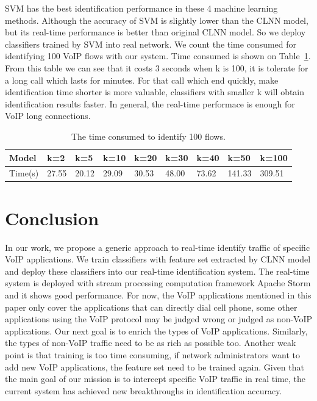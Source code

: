 \documentclass[conference]{IEEEtran}
\begin{document}
SVM has the best identification performance in these 4 machine learning methods. Although the accuracy of SVM is slightly lower than the CLNN model, but its real-time performance is better than original CLNN model. So we deploy classifiers trained by SVM into real network. We count the time consumed for identifying 100 VoIP flows with our system. Time consumed is shown on Table~\ref{tab:time4folws}. From this table we can see that it costs 3 seconds when k is 100, it is tolerate for a long call which lasts for minutes. For that call which end quickly, make identification time shorter is more valuable, classifiers with smaller k will obtain identification results faster. In general, the real-time performace is enough for VoIP long connections.
\begin{table}
  \caption{The time consumed to identify 100 flows.}
  \label{tab:time4folws}
  \centering
  \begin{tabular}{p{0.7cm}p{0.5cm}p{0.5cm}p{0.5cm}p{0.5cm}p{0.5cm}p{0.5cm}p{0.6cm}p{0.6cm}}
    \hline
    \textbf{Model} & \textbf{k=2} &\textbf{k=5}&\textbf{k=10}&\textbf{k=20}&\textbf{k=30}&\textbf{k=40}&\textbf{k=50}&\textbf{k=100}\\
    \hline
    Time(s)      & 27.55  & 20.12  &29.09&30.53&48.00&73.62&141.33&309.51  \\
    \hline
  \end{tabular}
\end{table}

\section{Conclusion}
\label{sec:conclusion}
In our work, we propose a generic approach to real-time identify traffic of specific VoIP applications. We train classifiers with feature set extracted by CLNN model and deploy these classifiers into our real-time identification system. The real-time system is deployed with stream processing computation framework Apache Storm and it shows good performance. For now, the VoIP applications mentioned in this paper only cover the applications that can directly dial cell phone, some other applications using the VoIP protocol may be judged wrong or judged as non-VoIP applications. Our next goal is to enrich the types of VoIP applications. Similarly, the types of non-VoIP traffic need to be as rich as possible too. Another weak point is that training is too time consuming, if network administrators want to add new VoIP applications, the feature set need to be trained again. Given that the main goal of our mission is to intercept specific VoIP traffic in real time, the current system has achieved new breakthroughs in identification accuracy.
\end{document}
